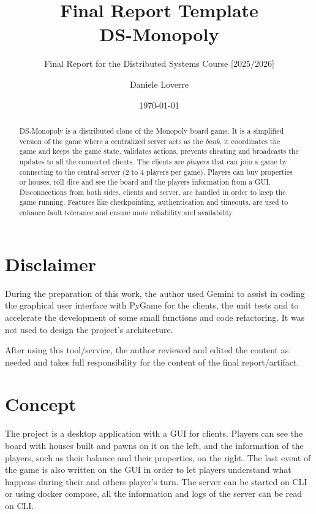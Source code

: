 \documentclass{scrartcl}
\title{\LARGE
    Final Report Template\\
    DS-Monopoly
}
\subtitle{Final Report for the Distributed Systems Course [2025/2026]}
\author{
    Daniele Loverre \\ \emailaddr{daniele.loverre@studio.unibo.it}
}
\date{\today}
\begin{document}
\nocite{*}

\maketitle

\begin{abstract}
  DS-Monopoly is a distributed clone of the Monopoly board game.
    It is a simplified version of the game where a centralized server acts as the \textit{bank},
  it coordinates the game and keeps the game state, validates actions, prevents cheating and
  broadcasts the updates to all the connected clients.
  The clients are \textit{players} that can join a game by connecting to the central server (2 to 4 players per game).
  Players can buy properties or houses, roll dice and see the board and the players information from a GUI.
  Disconnections from both sides, clients and server, are handled in order to keep the game running.
  Features like checkpointing, authentication and timeouts, are used to enhance fault tolerance and
  ensure more reliability and availability.
\end{abstract}

\section*{Disclaimer}

During the preparation of this work, the author used Gemini to assist in coding the graphical user interface
with PyGame for the clients, the unit tests and to accelerate the development of some small functions and code refactoring.
It was not used to design the project's architecture.

After using this tool/service, 
the author reviewed and edited the content as needed
and takes full responsibility for the content of the final report/artifact.

\section{Concept}\label{concept}

The project is a desktop application with a GUI for clients.
Players can see the board with houses built and pawns on it on the left,
and the information of the players, such as their balance and their properties, on the right.
The last event of the game is also written on the GUI in order to
let players understand what happens during their and others player's turn.
The server can be started on CLI or using docker compose, all the information and logs of the server can be read on CLI.
\end{document}
